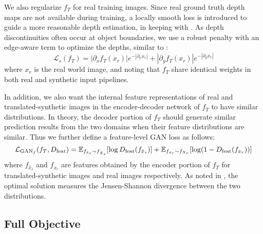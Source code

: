 \documentclass[runningheads]{llncs}
\begin{document}
We also regularize $f_T$ for real training images. Since real ground truth depth maps are not available during training, a locally smooth loss is introduced to guide a more reasonable depth estimation, in keeping with \cite{heise2013pm,garg2016unsupervised,godard2017unsupervised,kuznietsov2017semi}. As depth discontinuities often occur at object boundaries, we use a robust penalty with an edge-aware term to optimize the depths, similar to \cite{godard2017unsupervised}:
\begin{equation}\label{eq:4}
\mathcal{L}_{s}(f_T) = |\partial_xf_T(x_r)|e^{-|\partial_xx_r|} + |\partial_yf_T(x_r)|e^{-|\partial_yx_r|}
\end{equation}
where $x_r$ is the real world image, and noting that $f_T$ share identical weights in both real and synthetic input pipelines.

In addition, we also want the internal feature representations of real and translated-synthetic images in the encoder-decoder network of $f_T$ to have similar distributions\cite{ganin2015unsupervised}. In theory, the decoder portion of $f_T$ should generate similar prediction results from the two domains when their feature distributions are similar. Thus we further define a feature-level GAN loss as follows:
\begin{equation}\label{eq:5}
\small
\mathcal{L}_{\text{GAN}_f}(f_T, D_{\text{feat}}) =
\mathbb{E}_{f_{\hat{x}_s}\sim f_{\hat{X}_s}}[\log D_{\text{feat}}(f_{\hat{x}_s})] +
\mathbb{E}_{f_{x_r}\sim f_{X_r}}[\log(1-D_{\text{feat}}(f_{x_r}))]
\end{equation}  
where $f_{\hat{x}_s}$ and $f_{x_r}$ are features obtained by the encoder portion of $f_T$ for translated-synthetic images and real images respectively. As noted in \cite{goodfellow2014generative}, the optimal solution measures the Jensen-Shannon divergence between the two distributions.

\subsection{Full Objective}
\end{document}
